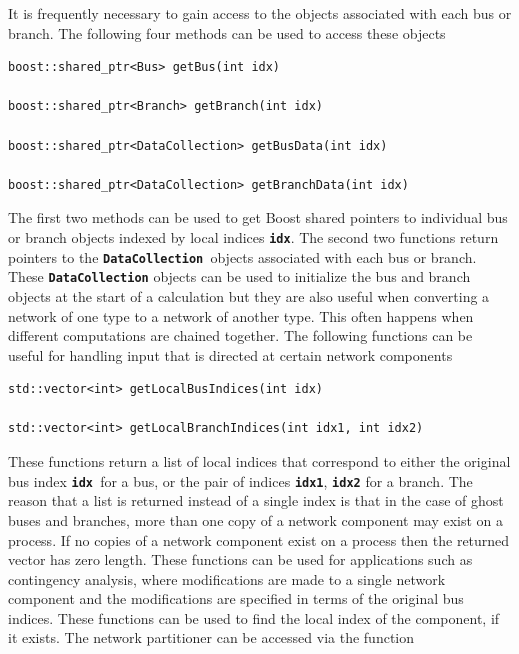 It is frequently necessary to gain access to the objects associated with each bus or branch. The following four methods can be used to access these objects

{
\color{red}
\begin{Verbatim}[fontseries=b]
boost::shared_ptr<Bus> getBus(int idx)

boost::shared_ptr<Branch> getBranch(int idx)

boost::shared_ptr<DataCollection> getBusData(int idx)

boost::shared_ptr<DataCollection> getBranchData(int idx)
\end{Verbatim}
}

The first two methods can be used to get Boost shared pointers to individual bus or branch objects indexed by local indices \texttt{\textbf{idx}}. The second two functions return pointers to the \texttt{\textbf{DataCollection }}objects associated with each bus or branch. These \texttt{\textbf{DataCollection}} objects can be used to initialize the bus and branch objects at the start of a calculation but they are also useful when converting a network of one type to a network of another type. This often happens when different computations are chained together.
The following functions can be useful for handling input that is directed at certain network components

{
\color{red}
\begin{Verbatim}[fontseries=b]
std::vector<int> getLocalBusIndices(int idx)

std::vector<int> getLocalBranchIndices(int idx1, int idx2)
\end{Verbatim}
}

These functions return a list of local indices that correspond to either the original bus index \texttt{\textbf{idx }}for a bus, or the pair of indices \texttt{\textbf{idx1}}, \texttt{\textbf{idx2}} for a branch. The reason that a list is returned instead of a single index is that in the case of ghost buses and branches, more than one copy of a network component may exist on a process. If no copies of a network component exist on a process then the returned vector has zero length. These functions can be used for applications such as contingency analysis, where modifications are made to a single network component and the modifications are specified in terms of the original bus indices. These functions can be used to find the local index of the component, if it exists. 
The network partitioner can be accessed via the function

